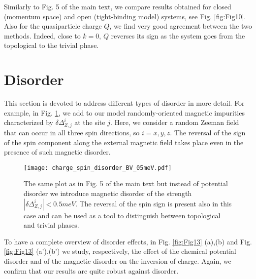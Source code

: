 \documentclass[prl,twocolumn,showpacs,floatfix,amsbsy,amsbsy,superscriptaddress]{revtex4-1}
\begin{document}
Similarly to Fig. 5 of the main text, we compare results obtained for closed (momentum space) and open (tight-binding model) systems, see Fig. \ref{fig:Fig10}. 
Also for the quasiparticle charge $Q$, we find very good agreement between the two methods. Indeed,  close to $k=0$, $Q$ reverses its sign as the system goes from the topological to the trivial phase. 



\section{Disorder}

This section is devoted to address different types of disorder in more detail. For example, in Fig. \ref{fig:Fig12}, we add to our model randomly-oriented magnetic impurities characterized by $\delta \Delta^{i}_{Z,j}$ at the site $j$. Here, we consider a random Zeeman field that can occur in all three spin directions, so $i=x,y,z$. The reversal of the sign of the spin component along the external magnetic field takes place even in
 the presence of such magnetic disorder.
 

\begin{figure}[ht]
\centering
\texttt{[image: charge\_spin\_disorder\_BV\_05meV.pdf]}
\caption{ The same plot as in Fig. 5 of the main text but instead of potential disorder we introduce magnetic disorder of the strength $|\delta\Delta^{i}_{Z,j}|<0.5meV$. The reversal of the spin sign is present also in this case and can be used as a tool to distinguish between topological and trivial phases.}
  \label{fig:Fig12}
\end{figure}

To have a complete overview of disorder effects, in Fig. \ref{fig:Fig13} (a),(b) and Fig. \ref{fig:Fig13} (a'),(b') we study, respectively, the effect of the chemical potential disorder and of the magnetic disorder on the inversion of charge. Again, we confirm that our results are quite robust against disorder.
\end{document}
